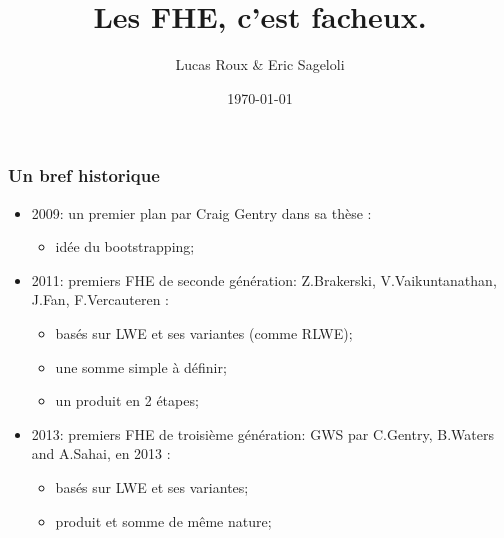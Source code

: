 \documentclass[10pt,xcolor={usenames,dvipsnames}]{beamer}
\title{Les FHE, c'est facheux.}
\date{\today}
\author{Lucas Roux \& Eric Sageloli}
\begin{document}
 \begin{frame} 
 \maketitle
 \end{frame}



 \begin{frame} 
 \frametitle{Un bref historique}

\begin{itemize}
\item 2009: un premier plan par Craig Gentry dans sa thèse :
\begin{itemize}
\item idée du bootstrapping;
\end{itemize}
\item 2011: premiers FHE de seconde génération: Z.Brakerski, V.Vaikuntanathan, J.Fan, F.Vercauteren :
	\begin{itemize}
	\item basés sur LWE et ses variantes (comme RLWE);
	\item une somme simple à définir;
	\item un produit en 2 étapes;
	\end{itemize}
\item 2013: premiers FHE de troisième génération: GWS par C.Gentry, B.Waters and A.Sahai, en 2013 :
	\begin{itemize}
	\item basés sur LWE et ses variantes;
	\item produit et somme de même nature;
	\end{itemize}
\end{itemize}
\end{frame} 

\end{document}
